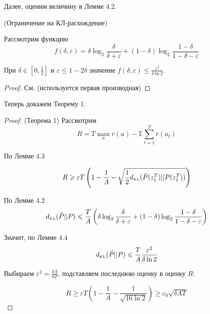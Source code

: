 \documentclass[a4paper]{article}
\newcommand{\E}{\mathbb{E}}
\newcommand{\dkl}{d_{\mbox{\tiny KL}}}
\newcommand{\ltwo}{\log_2 }
\def\eps{\varepsilon}
\begin{document}
Далее, оценим величину в Лемме 4.2.

\begin{lemma}{(Ограничение на КЛ-расхождение)}

Рассмотрим функцию $$f(\delta,\eps)=\delta\ltwo\frac{\delta}{\delta+\eps}+(1-\delta)\ltwo\frac{1-\delta}{1-\delta-\eps}$$

При $\delta\in[0,\frac{1}{2}]$ и $\eps\leqslant 1-2\delta$ значение $f(\delta,\eps)\leqslant\frac{\eps^2}{\delta\ln 2}$.
\end{lemma}

\begin{proof}
См. \cite{jaksch} (используется первая производная)
\end{proof}

Теперь докажем Теорему 1.

\begin{proof}{(Теорема 1)}
Рассмотрим
$$R=T\max\limits_a \overline{r}(a)-\E\sum\limits_{t=1}^T\overline{r}(a_t)$$

По Лемме 4.3

$$
R\geqslant\eps T \left(1-\frac{1}{A}-\sqrt{\frac{1}{2}\dkl(\tilde{P}(z_1^T)||P(z_1^T))}\right)
$$

По Лемме 4.2
$$
\dkl(\tilde{P}||P)\leqslant\frac{T}{A}\left(\delta\ltwo\frac{\delta}{\delta+\eps}+(1-\delta)\ltwo\frac{1-\delta}{1-\delta-\eps}\right)
$$

Значит, по Лемме 4.4
$$
\dkl(\tilde{P}||P)\leqslant \frac{T}{A}\frac{\eps^2}{\delta\ln 2}
$$

Выбираем $\eps^2=\frac{\delta A}{8T}$, подставляем последнюю оценку в оценку $R$:

$$
R\geqslant \eps T(1-\frac{1}{A}-\frac{1}{\sqrt{16\ln 2}})\geqslant c_0\sqrt{\delta AT}
$$
\end{proof}
\end{document}
